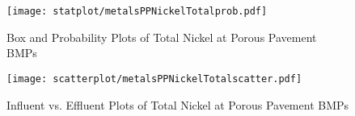         \begin{figure}[hb]   %
            \centering
            \texttt{[image: statplot/metalsPPNickelTotalprob.pdf]}
            \caption{Box and Probability Plots of Total Nickel at Porous Pavement BMPs}
        \end{figure}         %
        
        
        \begin{figure}[hb]   %
            \centering
            \texttt{[image: scatterplot/metalsPPNickelTotalscatter.pdf]}
            \caption{Influent vs. Effluent Plots of Total Nickel at Porous Pavement BMPs}
        \end{figure}         %
        \clearpage
        
